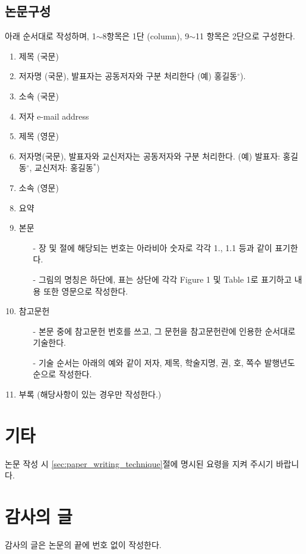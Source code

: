 \documentclass[a4paper,twocolumn]{article}
\begin{document}
\subsection{논문구성}
\label{subsec:paper_structure}

아래 순서대로 작성하며, 1$\sim$8항목은 1단 (column), 
9$\sim$11 항목은 2단으로 구성한다.

\begin{enumerate}
	\item 제목 (국문)
	\item 저자명 (국문), 발표자는 공동저자와 구분 처리한다 (예) 홍길동$^{\circ}$).
	\item 소속 (국문)
	\item 저자 e-mail address
	\item 제목 (영문)
	\item 저자명(국문), 발표자와 교신저자는 공동저자와 구분 처리한다. (예) 발표자: 홍길동$^{\circ}$, 교신저자: 홍길동$^{*}$)
	\item 소속 (영문)
	\item 요약
	\item 본문
	\begin{itemize}
		\item[-] 장 및 절에 해당되는 번호는 아라비아 숫자로 각각 1., 1.1 등과 같이 표기한다.
		\item[-] 그림의 명칭은 하단에, 표는 상단에 각각 Figure 1 및 Table 1로 표기하고 내용 또한 영문으로 작성한다.
	\end{itemize}
	\item 참고문헌
	\begin{itemize}
		\item[-] 본문 중에 참고문헌 번호를 쓰고, 그 문헌을 참고문헌란에 인용한 순서대로 기술한다.
		\item[-] 기술 순서는 아래의 예와 같이 저자, 제목, 학술지명, 권, 호, 쪽수 발행년도 순으로 작성한다.
	\end{itemize}
	\item 부록 (해당사항이 있는 경우만 작성한다.)
\end{enumerate}


\section{기타}
\label{sec:misc}

논문 작성 시 \ref{sec:paper_writing_technique}절에 명시된 요령을 지켜 주시기 바랍니다.


\section*{감사의 글}

감사의 글은 논문의 끝에 번호 없이 작성한다.



\nocite{*}


\end{document}
